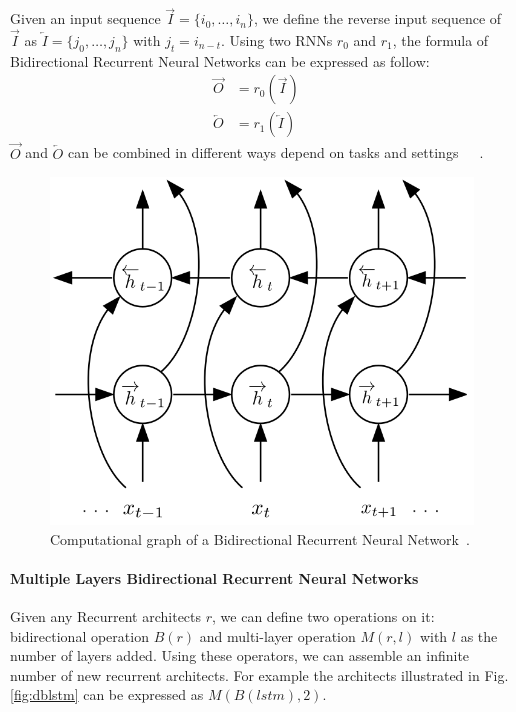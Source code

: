 Given an input sequence \(\overrightarrow{I} = \{i_0,\ldots,i_n\}\), we define the reverse input sequence of \(\overrightarrow{I}\) as \(\overleftarrow{I} = \{j_0,\ldots,j_n\}\) with \(j_t = i_{n-t}\). 
Using two RNNs \(r_0\) and \(r_1\), the formula of Bidirectional Recurrent Neural Networks can be expressed as follow:
\begin{align}
    \overrightarrow{O} &= r_0(\overrightarrow{I}) &\\
    \overleftarrow{O} &= r_1(\overleftarrow{I}) &
\end{align}
\(\overrightarrow{O}\) and \(\overleftarrow{O}\) can be combined in different ways depend on tasks and settings~\cite{GravesLSTM}~\cite{Graves-thesis}~\cite{treeLSTM}.

\begin{figure}[H]
    \centering
    \includegraphics[scale=0.4]{figure/blstm}
    \caption{Computational graph of a Bidirectional Recurrent Neural Network~\cite{GravesLSTM}.}
    \label{fig:blstm}
\end{figure}

\paragraph{Multiple Layers Bidirectional Recurrent Neural Networks}
Given any Recurrent architects \(r\), we can define two operations on it: bidirectional operation \(B(r)\) and multi-layer operation \(M(r, l)\) with \(l\) as the number of layers added.
Using these operators, we can assemble an infinite number of new recurrent architects. 
For example the architects illustrated in Fig.\ref{fig:dblstm} can be expressed as \(M(B(lstm), 2)\).

